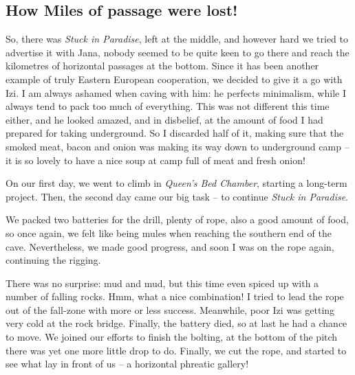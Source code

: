 
\hypertarget{how-miles-of-passage-were-lost}{%
\subsection{How Miles of passage were
lost!}\label{how-miles-of-passage-were-lost}}

So, there was \emph{Stuck in Paradise}, left at the middle, and however
hard we tried to advertise it with Jana, nobody seemed to be quite keen
to go there and reach the kilometres of horizontal passages at the
bottom. Since it has been another example of truly Eastern European
cooperation, we decided to give it a go with Izi. I am always ashamed
when caving with him: he perfects minimalism, while I always tend to
pack too much of everything. This was not different this time either,
and he looked amazed, and in disbelief, at the amount of food I had
prepared for taking underground. So I discarded half of it, making sure
that the smoked meat, bacon and onion was making its way down to
underground camp -- it is so lovely to have a nice soup at camp full of
meat and fresh onion!

On our first day, we went to climb in \emph{Queen's Bed Chamber},
starting a long-term project. Then, the second day came our big task --
to continue \emph{Stuck in Paradise}.

We packed two batteries for the drill, plenty of rope, also a good
amount of food, so once again, we felt like being mules when reaching
the southern end of the cave. Nevertheless, we made good progress, and
soon I was on the rope again, continuing the rigging.

There was no surprise: mud and mud, but this time even spiced up with a
number of falling rocks. Hmm, what a nice combination! I tried to lead
the rope out of the fall-zone with more or less success. Meanwhile, poor
Izi was getting very cold at the rock bridge. Finally, the battery died,
so at last he had a chance to move. We joined our efforts to finish the
bolting, at the bottom of the pitch there was yet one more little drop
to do. Finally, we cut the rope, and started to see what lay in front of
us -- a horizontal phreatic gallery!


